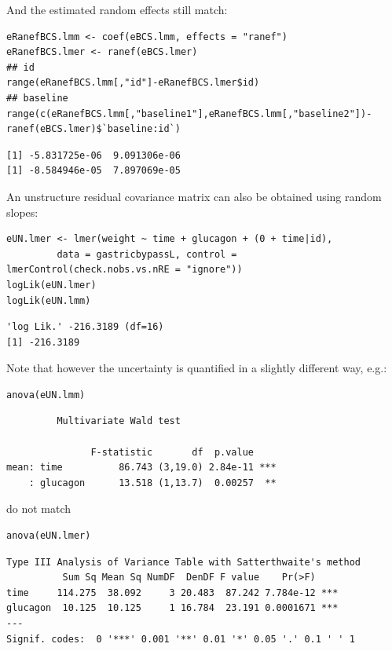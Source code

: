 \documentclass[12pt]{article}
\begin{document}
And the estimated random effects still match:
\lstset{language=r,label= ,caption= ,captionpos=b,numbers=none}
\begin{lstlisting}
eRanefBCS.lmm <- coef(eBCS.lmm, effects = "ranef")
eRanefBCS.lmer <- ranef(eBCS.lmer)
## id
range(eRanefBCS.lmm[,"id"]-eRanefBCS.lmer$id)
## baseline
range(c(eRanefBCS.lmm[,"baseline1"],eRanefBCS.lmm[,"baseline2"])-ranef(eBCS.lmer)$`baseline:id`)
\end{lstlisting}

\begin{verbatim}
[1] -5.831725e-06  9.091306e-06
[1] -8.584946e-05  7.897069e-05
\end{verbatim}


\clearpage

An unstructure residual covariance matrix can also be obtained using
random slopes:
\lstset{language=r,label= ,caption= ,captionpos=b,numbers=none}
\begin{lstlisting}
eUN.lmer <- lmer(weight ~ time + glucagon + (0 + time|id),
		 data = gastricbypassL, control = lmerControl(check.nobs.vs.nRE = "ignore"))
logLik(eUN.lmer)
logLik(eUN.lmm)
\end{lstlisting}

\begin{verbatim}
'log Lik.' -216.3189 (df=16)
[1] -216.3189
\end{verbatim}


Note that however the uncertainty is quantified in a slightly different way, e.g.:
\lstset{language=r,label= ,caption= ,captionpos=b,numbers=none}
\begin{lstlisting}
anova(eUN.lmm)
\end{lstlisting}

\begin{verbatim}
	     Multivariate Wald test 

               F-statistic       df  p.value    
mean: time          86.743 (3,19.0) 2.84e-11 ***
    : glucagon      13.518 (1,13.7)  0.00257  **
\end{verbatim}


do not match
\lstset{language=r,label= ,caption= ,captionpos=b,numbers=none}
\begin{lstlisting}
anova(eUN.lmer)
\end{lstlisting}

\begin{verbatim}
Type III Analysis of Variance Table with Satterthwaite's method
          Sum Sq Mean Sq NumDF  DenDF F value    Pr(>F)    
time     114.275  38.092     3 20.483  87.242 7.784e-12 ***
glucagon  10.125  10.125     1 16.784  23.191 0.0001671 ***
---
Signif. codes:  0 '***' 0.001 '**' 0.01 '*' 0.05 '.' 0.1 ' ' 1
\end{verbatim}
\end{document}

